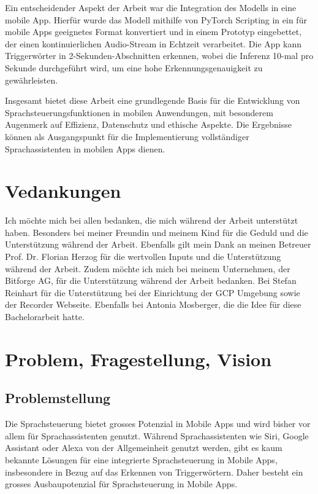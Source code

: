 \documentclass[11pt,a4paper]{article}
\begin{document}
\noindent \newline
Ein entscheidender Aspekt der Arbeit war die Integration des Modells in eine mobile App. Hierfür wurde 
das Modell mithilfe von PyTorch Scripting in ein für mobile Apps geeignetes Format konvertiert und 
in einem Prototyp eingebettet, der einen kontinuierlichen Audio-Stream in Echtzeit verarbeitet. Die 
App kann Triggerwörter in 2-Sekunden-Abschnitten erkennen, wobei die Inferenz 10-mal pro 
Sekunde durchgeführt wird, um eine hohe Erkennungsgenauigkeit zu gewährleisten.

\noindent \newline
Insgesamt bietet diese Arbeit eine grundlegende Basis für die Entwicklung von 
Sprachsteuerungsfunktionen in mobilen Anwendungen, mit besonderem Augenmerk auf Effizienz, 
Datenschutz und ethische Aspekte. Die Ergebnisse können als Ausgangspunkt für die Implementierung 
vollständiger Sprachassistenten in mobilen Apps dienen.


\section*{Vedankungen}
Ich möchte mich bei allen bedanken, die mich während der Arbeit unterstützt haben. Besonders bei 
meiner Freundin und meinem Kind für die Geduld und die Unterstützung während der Arbeit. Ebenfalls 
gilt mein Dank an meinen Betreuer Prof. Dr. Florian Herzog für die wertvollen Inputs und die 
Unterstützung während der Arbeit. Zudem möchte ich mich bei meinem Unternehmen, der Bitforge AG, 
für die Unterstützung während der Arbeit bedanken. Bei Stefan Reinhart für die Unterstützung bei 
der Einrichtung der GCP Umgebung sowie der Recorder Webseite. Ebenfalls bei Antonia 
Mosberger, die die Idee für diese Bachelorarbeit hatte.


\newpage
{}
\tableofcontents
{}
\newpage


\newpage \section{Problem, Fragestellung, Vision}
\subsection{Problemstellung}
Die Sprachsteuerung bietet grosses Potenzial in Mobile Apps und wird bisher vor allem für 
Sprachassistenten genutzt. Während Sprachassistenten wie Siri, Google Assistant oder Alexa 
von der Allgemeinheit genutzt werden, gibt es kaum bekannte Lösungen für eine integrierte Sprachsteuerung in Mobile Apps, insbesondere in 
Bezug auf das Erkennen von Triggerwörtern. Daher besteht ein grosses Ausbaupotenzial für 
Sprachsteuerung in Mobile Apps. 
\end{document}
